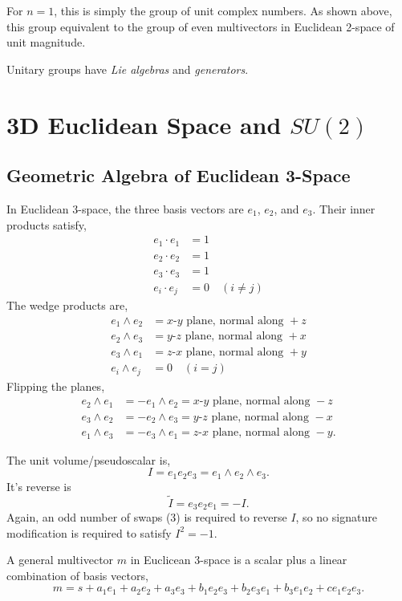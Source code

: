 	For $n = 1$, this is simply the group of unit complex numbers. As shown above, this group equivalent to the group of even multivectors in Euclidean 2-space of unit magnitude.
	
	Unitary groups have \emph{Lie algebras} and \emph{generators}. 
	
	\section{3D Euclidean Space and $SU\left( 2\right) $}
	\subsection{Geometric Algebra of Euclidean 3-Space}
	In Euclidean 3-space, the three basis vectors are $e_1$, $e_2$, and $e_3$. Their inner products satisfy,	
	\begin{align*}
		e_1 \cdot e_1 & = 1\\
		e_2 \cdot e_2 & = 1\\
		e_3 \cdot e_3 & = 1\\		
		e_i \cdot e_j & = 0 \quad \left(i\neq j\right)
	\end{align*}	
	The wedge products are,	
	\begin{align*}		
		e_1 \wedge e_2 & = x\text{-}y\text{ plane, normal along }+z\\
		e_2 \wedge e_3 & = y\text{-}z\text{ plane, normal along }+x\\
		e_3 \wedge e_1 & = z\text{-}x\text{ plane, normal along }+y\\
		e_i \wedge e_j & = 0 \quad \left(i=j\right)
	\end{align*}
	Flipping the planes,
	\begin{align*}		
	e_2 \wedge e_1 & = -e_1 \wedge e_2 = x\text{-}y\text{ plane, normal along }-z\\
	e_3 \wedge e_2 & = -e_2 \wedge e_3 = y\text{-}z\text{ plane, normal along }-x\\
	e_1 \wedge e_3 & = -e_3 \wedge e_1 = z\text{-}x\text{ plane, normal along }-y.
	\end{align*}
	
	The unit volume/pseudoscalar is,
	\[
	I = e_1e_2e_3 = e_1 \wedge e_2 \wedge e_3.  
	\]
	It's reverse is
	\[
	\tilde{I} = e_3e_2e_1 = -I.
	\]
	Again, an odd number of swaps (3) is required to reverse $I$, so no signature modification is required to satisfy $I^2=-1.$
	
	A general multivector $m$ in Euclicean 3-space is a scalar plus a linear combination of basis vectors,
	\[
	m = s + a_1e_1 + a_2e_2 + a_3e_3 + b_1e_2e_3 + b_2e_3e_1 + b_3e_1e_2 + ce_1e_2e_3.
	\] 
